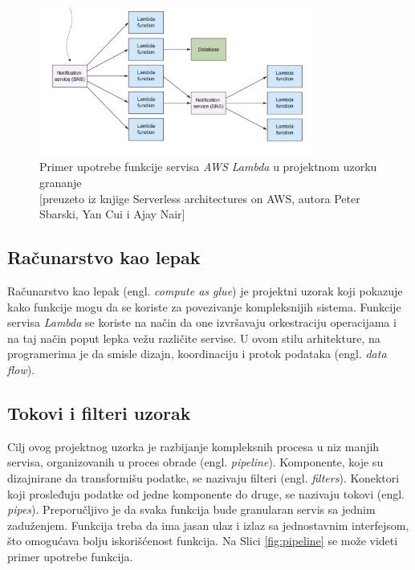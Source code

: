 \documentclass[12pt,oneside]{memoir}
\begin{document}
\begin{figure}[!ht]
  \centering
  \includegraphics[width=0.8\textwidth]{Slika 15.png}
  \caption{Primer upotrebe funkcije servisa \emph{AWS Lambda} u projektnom uzorku grananje\\\footnotesize[preuzeto iz knjige Serverless architectures on AWS, autora Peter Sbarski, Yan Cui i Ajay Nair]}
  \label{fig:grananje}
\end{figure}

\subsection{Računarstvo kao lepak} %
Računarstvo kao lepak (engl. \emph{compute as glue}) je projektni uzorak koji pokazuje kako funkcije mogu da se koriste za povezivanje kompleksnijih sistema. Funkcije servisa \emph{Lambda} se koriste na način da one izvršavaju orkestraciju operacijama i na taj način poput lepka vežu različite servise. U ovom stilu arhitekture, na programerima je da smisle dizajn, koordinaciju i protok podataka (engl. \emph{data flow}). 

\subsection{Tokovi i filteri uzorak}
Cilj ovog projektnog uzorka je razbijanje kompleksnih procesa u niz manjih servisa, organizovanih u proces obrade (engl. \emph{pipeline}). Komponente, koje su dizajnirane da transformišu podatke, se nazivaju filteri (engl. \emph{filters}). Konektori koji prosleđuju podatke od jedne komponente do druge, se nazivaju tokovi (engl. \emph{pipes}). Preporučljivo je da svaka funkcija bude granularan servis sa jednim zaduženjem. Funkcija treba da ima jasan ulaz i izlaz sa jednostavnim interfejsom, što omogućava bolju iskorišćenost funkcija. Na Slici \ref{fig:pipeline} se može videti primer upotrebe funkcija.
\end{document}
